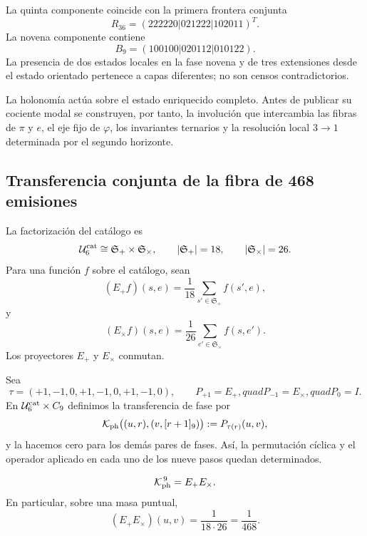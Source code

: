 La quinta componente coincide con la primera frontera conjunta
\[
 R_{36}=(222220|021222|102011)^T.
\]
La novena componente contiene
\[
 B_9=(100100|020112|010122).
\]
La presencia de dos estados locales en la fase novena y de tres extensiones
desde el estado orientado pertenece a capas diferentes; no son censos
contradictorios.

La holonomía actúa sobre el estado enriquecido completo. Antes de publicar
su cociente modal se construyen, por tanto, la involución que intercambia
las fibras de \(\pi\) y \(e\), el eje fijo de \(\varphi\), los invariantes
ternarios y la resolución local \(3\to1\) determinada por el segundo
horizonte.

\begin{HMTScientificOwnerSubordinated}

\end{HMTScientificOwnerSubordinated}

\subsection{Transferencia conjunta de la fibra de 468 emisiones}

La factorización del catálogo es
\[
 \mathcal U_6^{\rm cat}\cong
 \mathfrak S_+\times\mathfrak S_\times,
 \qquad
 |\mathfrak S_+|=18,\qquad |\mathfrak S_\times|=26.
\]
Para una función \(f\) sobre el catálogo, sean
\[
 (E_+f)(s,e)=\frac1{18}\sum_{s'\in\mathfrak S_+}f(s',e),
\]
y
\[
 (E_\times f)(s,e)=\frac1{26}
 \sum_{e'\in\mathfrak S_\times}f(s,e').
\]
Los proyectores \(E_+\) y \(E_\times\) conmutan.

Sea
\[
 \tau=(+1,-1,0,+1,-1,0,+1,-1,0),
 \qquad
 P_{+1}=E_+,quad P_{-1}=E_\times,quad P_0=I.
\]
En \(\mathcal U_6^{\rm cat}\times C_9\) definimos la transferencia de fase
por
\begin{equation}
 \mathcal K_{\rm ph}\bigl((u,r),(v,[r+1]_9)\bigr)
 :=P_{\tau(r)}(u,v),
 \label{p12-83-c7-s1:eq:u009-kph-explicita}
\end{equation}
y la hacemos cero para los demás pares de fases. Así, la permutación cíclica
y el operador aplicado en cada uno de los nueve pasos quedan determinados.

\begin{proposition}
\label{p12-83-c7-s1:prop:transferencia-conjunta-nueve}
\[
 \mathcal K_{\rm ph}^{\,9}=E_+E_\times.
\]
En particular, sobre una masa puntual,
\[
 (E_+E_\times)(u,v)=\frac1{18\cdot26}=\frac1{468}.
\]
\end{proposition}

